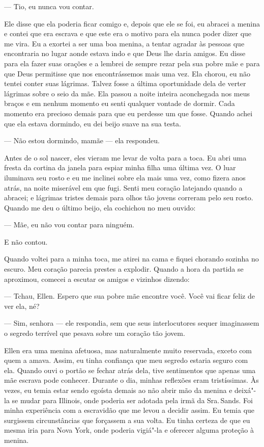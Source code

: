 --- Tio, eu nunca vou contar.

Ele disse que ela poderia ficar comigo e, depois que ele se foi, eu
abracei a menina e contei que era escrava e que este era o motivo para
ela nunca poder dizer que me vira. Eu a exortei a ser uma boa menina, a
tentar agradar às pessoas que encontraria no lugar aonde estava indo e
que Deus lhe daria amigos. Eu disse para ela fazer suas orações e a
lembrei de sempre rezar pela sua pobre mãe e para que Deus permitisse
que nos encontrássemos mais uma vez. Ela chorou, eu não tentei conter
suas lágrimas. Talvez fosse a última oportunidade dela de verter
lágrimas sobre o seio da mãe. Ela passou a noite inteira aconchegada nos
meus braços e em nenhum momento eu senti qualquer vontade de dormir.
Cada momento era precioso demais para que eu perdesse um que fosse.
Quando achei que ela estava dormindo, eu dei beijo suave na sua testa.

--- Não estou dormindo, mamãe --- ela respondeu.

Antes de o sol nascer, eles vieram me
levar de volta para a toca. Eu abri uma fresta da cortina da janela para
espiar minha filha uma última vez. O luar iluminava seu rosto e eu me
inclinei sobre ela mais uma vez, como fizera anos atrás, na noite
miserável em que fugi. Senti meu coração latejando quando a abracei; e
lágrimas tristes demais para olhos tão jovens correram pelo seu rosto.
Quando me deu o último beijo, ela cochichou no meu ouvido:

--- Mãe, eu não vou contar para ninguém.

E não contou.

Quando voltei para a minha toca, me
atirei na cama e fiquei chorando sozinha no escuro. Meu coração parecia
prestes a explodir. Quando a hora da partida se aproximou, comecei a
escutar os amigos e vizinhos dizendo:

--- Tchau, Ellen. Espero que sua pobre mãe encontre você. Você vai ficar
feliz de ver ela, né?

--- Sim, senhora --- ele respondia, sem que seus interlocutores sequer
imaginassem o segredo terrível que pesava sobre um coração tão jovem.

Ellen era uma menina afetuosa, mas naturalmente muito reservada, exceto
com quem a amava. Assim, eu tinha confiança que meu segredo estaria
seguro com ela. Quando ouvi o portão se fechar atrás dela, tive
sentimentos que apenas uma mãe escrava pode conhecer. Durante o dia,
minhas reflexões eram tristíssimas. Às vezes, eu temia estar sendo
egoísta demais ao não abrir mão da menina e deixá"-la se mudar para
Illinois, onde poderia ser adotada pela irmã da Sra.\,Sands. Foi minha
experiência com a escravidão que me levou a decidir assim. Eu temia que
surgissem circunstâncias que forçassem a sua volta. Eu tinha certeza de
que eu mesma iria para Nova York, onde poderia vigiá"-la e oferecer
alguma proteção à menina.

